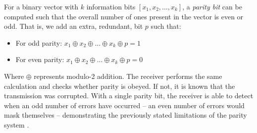 \noindent For a binary vector with $k$ information bits $[x_1, x_2, …, x_k]$, a \emph{parity bit} can be computed such that the overall 
number of ones present in the vector is even or odd. That is, we add an extra, redundant, bit $p$ such that:
\begin{itemize}
    \item For odd parity: $x_1 \oplus x_2 \oplus ... \oplus x_k \oplus p = 1$
    \item For even parity: $x_1 \oplus x_2 \oplus ... \oplus x_k \oplus p = 0$
\end{itemize}

\noindent Where $\oplus$ represents modulo-2 addition. The receiver performs the same calculation and checks whether parity is obeyed. If 
not, it is known that the transmission was corrupted. With a single parity bit, the receiver is able to detect when an odd number of 
errors have occurred -- an even number of errors would mask themselves -- demonstrating the previously stated limitations of the parity 
system \cite{comms}.
